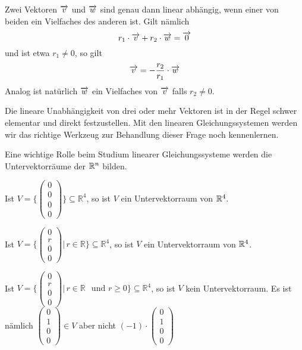 \begin{notiz} Zwei Vektoren $\overrightarrow{v}$ und $\overrightarrow{w}$ sind genau dann linear abhängig, wenn 
einer von beiden ein Vielfaches des anderen ist. Gilt nämlich 
  	$$ r_1 \cdot \overrightarrow{v} + r_2 \cdot \overrightarrow{w} = \overrightarrow{0} $$
und ist etwa $r_1 \neq 0$, so gilt
  	$$ \overrightarrow{v} = - \frac {r_2}{r_1} \cdot \overrightarrow{w} $$
Analog ist natürlich $\overrightarrow{w}$ ein Vielfaches von $\overrightarrow{v}$ falls $r_2 \neq 0$.
\end{notiz}

\begin{notiz} Die lineare Unabhängigkeit von drei oder mehr Vektoren ist in der Regel schwer elementar und 
direkt festzustellen. Mit den linearen Gleichungssystemen werden wir das richtige Werkzeug zur Behandlung 
dieser Frage noch kennenlernen. 
\end{notiz}

Eine wichtige Rolle beim Studium linearer Gleichungssysteme werden die Untervektorräume der $\mathbb R^n$ bilden.

\begin{beispiel}\label{uvr_null_uvr} 
Ist $V = \{ \left( \begin{smallmatrix} 0 \\ 0 \\ 0 \\ 0 \end{smallmatrix} \right) \} \subseteq \mathbb R^4$, so  
ist $V$ ein Untervektorraum von $\mathbb R^4$.
\end{beispiel}


\begin{beispiel}\label{uvr_y_axis} 
Ist $V = \{ \left( \begin{smallmatrix} 0 \\ r \\ 0 \\ 0 \end{smallmatrix} \right) \vert \, 
r \in \mathbb R\} \subseteq \mathbb R^4$, so ist $V$ ein Untervektorraum von $\mathbb R^4$.
\end{beispiel}

\begin{beispiel} Ist $V = \{ \left( \begin{smallmatrix} 0 \\ r \\ 0 \\ 0 \end{smallmatrix} \right) \vert \,  
r \in \mathbb R\ \, \textrm{ und } r \geq 0 \} \subseteq \mathbb R^4$, so ist $V$ kein Untervektorraum. Es ist 
nämlich $\left( \begin{smallmatrix} 0 \\ 1 \\ 0 \\ 0 \end{smallmatrix} \right) \in V$ aber nicht 
$(-1) \cdot \left( \begin{smallmatrix} 0 \\ 1 \\ 0 \\ 0 \end{smallmatrix} \right)$
\end{beispiel}

